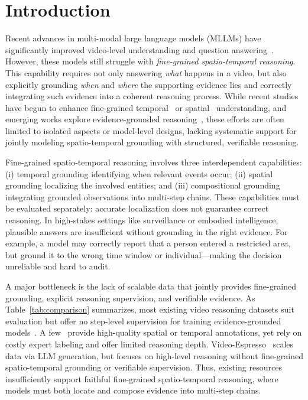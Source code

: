 \documentclass[letterpaper]{article} %
\begin{document}
\section{Introduction}
\label{sec:intro}

Recent advances in multi-modal large language models (MLLMs) have significantly improved video-level understanding and question answering~\citep{bai2025qwen2, liu2023visual, hurst2024gpt}. However, these models still struggle with \emph{fine-grained spatio-temporal reasoning}. This capability requires not only answering \emph{what} happens in a video, but also explicitly grounding \emph{when} and \emph{where} the supporting evidence lies and correctly integrating such evidence into a coherent reasoning process. While recent studies have begun to enhance fine-grained temporal~\citep{han2025videoespresso} or spatial~\citep{yuan2025eoc} understanding, and emerging works explore evidence-grounded reasoning~\citep{wang2025traceable, feng2025video, wang2025videorft, meng2026openo3videogroundedvideoreasoning}, these efforts are often limited to isolated aspects or model-level designs, lacking systematic support for jointly modeling spatio-temporal grounding with structured, verifiable reasoning.

Fine-grained spatio-temporal reasoning involves three interdependent capabilities: (i) temporal grounding identifying when relevant events occur; (ii) spatial grounding localizing the involved entities; and (iii) compositional grounding integrating grounded observations into multi-step chains. These capabilities must be evaluated separately: accurate localization does not guarantee correct reasoning. In high-stakes settings like surveillance or embodied intelligence, plausible answers are insufficient without grounding in the right evidence. For example, a model may correctly report that a person entered a restricted area, but ground it to the wrong time window or individual---making the decision unreliable and hard to audit.

A major bottleneck is the lack of scalable data that jointly provides fine-grained grounding, explicit reasoning supervision, and verifiable evidence.
As Table~\ref{tab:comparison} summarizes, most existing video reasoning datasets suit evaluation but offer no step-level supervision for training evidence-grounded models~\citep{fu2025video, hong2025motionbench, xiao2021next, dang2025ecbench, qi2025vcr}.
A few~\citep{liu2024bench, yuan2025eoc} provide high-quality spatial or temporal annotations, yet rely on costly expert labeling and offer limited reasoning depth.
Video-Espresso~\citep{han2025videoespresso} scales data via LLM generation, but focuses on high-level reasoning without fine-grained spatio-temporal grounding or verifiable supervision.
Thus, existing resources insufficiently support faithful fine-grained spatio-temporal reasoning, where models must both locate and compose evidence into multi-step chains.
\end{document}
